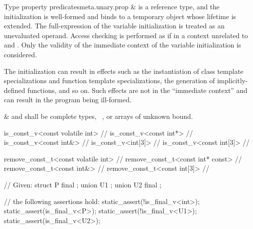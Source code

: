 \begin{libreqtab3b}{Type property predicates}{meta.unary.prop}
%
\br
   &
   is a reference type, and
  the initialization 
  is well-formed and binds  to
  a temporary object whose lifetime is extended.
  The full-expression of the variable initialization is
  treated as an unevaluated operand.
  Access checking is performed as if in
  a context unrelated to  and .
  Only the validity of the immediate context of
  the variable initialization is considered.
  \begin{tailnote}
  The initialization can result in effects such as
  the instantiation of class template specializations and
  function template specializations,
  the generation of implicitly-defined functions, and so on.
  Such effects are not in the ``immediate context'' and
  can result in the program being ill-formed.
  \end{tailnote}
&
   and  shall be
  complete types, \cv{}~, or arrays of unknown bound.  \\ \rowsep

\end{libreqtab3b}

\pnum
\begin{example}
\begin{codeblock}
is_const_v<const volatile int>      // 
is_const_v<const int*>              // 
is_const_v<const int&>              // 
is_const_v<int[3]>                  // 
is_const_v<const int[3]>            // 
\end{codeblock}
\end{example}

\pnum
\begin{example}
\begin{codeblock}
remove_const_t<const volatile int>  // 
remove_const_t<const int* const>    // 
remove_const_t<const int&>          // 
remove_const_t<const int[3]>        // 
\end{codeblock}
\end{example}

\pnum
\begin{example}
\begin{codeblock}
// Given:
struct P final { };
union U1 { };
union U2 final { };

// the following assertions hold:
static_assert(!is_final_v<int>);
static_assert(is_final_v<P>);
static_assert(!is_final_v<U1>);
static_assert(is_final_v<U2>);
\end{codeblock}
\end{example}

